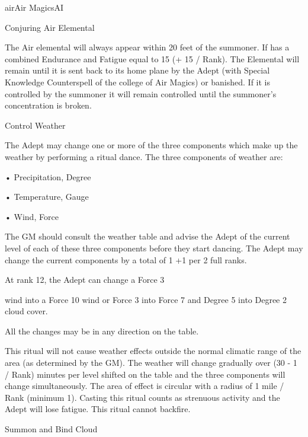 \begin{College}[2.1]{air}{Air Magics}{AI}
\begin{ritual}[R-2]{Conjuring Air Elemental}
\begin{effects}
The Air elemental will always appear within 20 feet of the summoner.
If has a combined Endurance and Fatigue equal to 15 (+ 15 / Rank).
The Elemental will remain until it is sent back to its home plane by
the Adept (with Special Knowledge Counterspell of the college of Air
Magics) or banished.  If it is controlled by the summoner it will
remain controlled until the summoner’s concentration is broken.
\end{effects}
\end{ritual}

\begin{ritual}[R-3]{Control Weather}

\begin{effects}
The Adept may change one or more of the three components which make up
the weather by performing a ritual dance. The three components of
weather are:

• Precipitation, Degree  

• Temperature, Gauge  

• Wind, Force 

The GM should consult the weather table and advise the Adept of the
current level of each of these three components before they start
dancing.  The Adept may change the current components by a total of 1
+1 per 2 full ranks.

At rank 12, the Adept can change a Force 3 
\begin{example}
wind into a Force 10 wind or Force 3 into Force 7 and Degree 5 into
Degree 2 cloud cover.
\end{example}

All the changes may be in any direction on the table.

This ritual will not cause weather effects outside the normal climatic
range of the area (as determined by the GM).  The weather will change
gradually over (30 - 1 / Rank) minutes per level shifted on the table
and the three components will change simultaneously. The area of
effect is circular with a radius of 1 mile / Rank (minimum 1).
Casting this ritual counts as strenuous activity and the Adept will
lose fatigue. This ritual cannot backfire.
\end{effects}
\end{ritual}

\begin{ritual}[R-4]{Summon and Bind Cloud}


\end{ritual}
\end{College}
